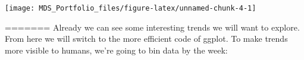 \documentclass[]{article}
\newenvironment{Shaded}{\begin{snugshade}}{\end{snugshade}}
\newcommand{\KeywordTok}[1]{\textcolor[rgb]{0.13,0.29,0.53}{\textbf{#1}}}
\newcommand{\DataTypeTok}[1]{\textcolor[rgb]{0.13,0.29,0.53}{#1}}
\newcommand{\DecValTok}[1]{\textcolor[rgb]{0.00,0.00,0.81}{#1}}
\newcommand{\StringTok}[1]{\textcolor[rgb]{0.31,0.60,0.02}{#1}}
\newcommand{\OtherTok}[1]{\textcolor[rgb]{0.56,0.35,0.01}{#1}}
\newcommand{\OperatorTok}[1]{\textcolor[rgb]{0.81,0.36,0.00}{\textbf{#1}}}
\newcommand{\NormalTok}[1]{#1}
\begin{document}
\begin{Shaded}
\end{Shaded}

\begin{center}\texttt{[image: MDS\_Portfolio\_files/figure-latex/unnamed-chunk-4-1]} \end{center}

======= Already we can see some interesting trends we will want to
explore. From here we will switch to the more efficient code of ggplot.
To make trends more visible to humans, we're going to bin data by the
week:
\end{document}
